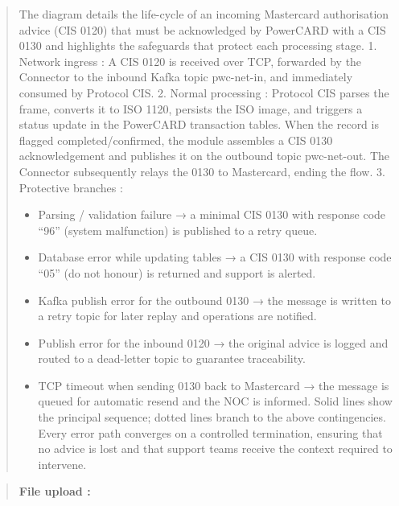 \documentclass[12pt,a4paper]{report}
\begin{document}
\begin{quote}
The diagram details the life-cycle of an incoming Mastercard authorisation advice (CIS 0120) that must be acknowledged by PowerCARD with a CIS 0130 and highlights the safeguards that protect each processing stage.
1.	Network ingress : A CIS 0120 is received over TCP, forwarded by the Connector to the inbound Kafka topic pwc-net-in, and immediately consumed by Protocol CIS.
2.	Normal processing : Protocol CIS parses the frame, converts it to ISO 1120, persists the ISO image, and triggers a status update in the PowerCARD transaction tables. When the record is flagged completed/confirmed, the module assembles a CIS 0130 acknowledgement and publishes it on the outbound topic pwc-net-out. The Connector subsequently relays the 0130 to Mastercard, ending the flow.
3.	Protective branches :
\begin{itemize}
\item Parsing / validation failure → a minimal CIS 0130 with response code “96” (system malfunction) is published to a retry queue.
\item Database error while updating tables → a CIS 0130 with response code “05” (do not honour) is returned and support is alerted.
\item Kafka publish error for the outbound 0130 → the message is written to a retry topic for later replay and operations are notified.
\item Publish error for the inbound 0120 → the original advice is logged and routed to a dead-letter topic to guarantee traceability.
\item TCP timeout when sending 0130 back to Mastercard → the message is queued for automatic resend and the NOC is informed.
Solid lines show the principal sequence; dotted lines branch to the above contingencies. Every error path converges on a controlled termination, ensuring that no advice is lost and that support teams receive the context required to intervene.
\end{itemize}

\end{quote}
\clearpage

\begin{quote}
\textbf{File upload :}
\end{quote}
\end{document}
